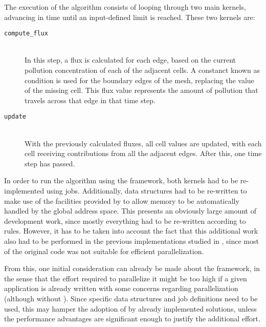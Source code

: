 \documentclass[main.tex]{subfiles}
\begin{document}
The execution of the algorithm consists of looping through two main kernels, advancing in time until an input-defined limit is reached. These two kernels are:
\begin{description}
\item[\texttt{compute\_flux}] \hfill \\
  In this step, a flux is calculated for each edge, based on the current pollution concentration of each of the adjacent cells. A constanct known as  condition is used for the boundary edges of the mesh, replacing the value of the missing cell. This flux value represents the amount of pollution that travels across that edge in that time step.

\item[\texttt{update}] \hfill \\
  With the previously calculated fluxes, all cell values are updated, with each cell receiving contributions from all the adjacent edges. After this, one time step has passed.
\end{description}


In order to run the algorithm using the framework, both kernels had to be re-implemented using \gama jobs. Additionally, data structures had to be re-written to make use of the facilities provided by \gama to allow memory to be automatically handled by the global address space.
This presents an obviously large amount of development work, since mostly everything had to be re-written according to \gama rules. However, it has to be taken into account the fact that this additional work also had to be performed in the previous implementations studied in \cite{naps2012}, since most of the original code was not suitable for efficient parallelization.

From this, one initial consideration can already be made about the framework, in the sense that the effort required to parallelize it might be too high if a given application is already written with some concerns regarding parallelization (although without \gama). Since specific data structures and job definitions need to be used, this may hamper the adoption of \gama by already implemented solutions, unless the performance advantages are significant enough to justify the additional effort.


\end{document}
